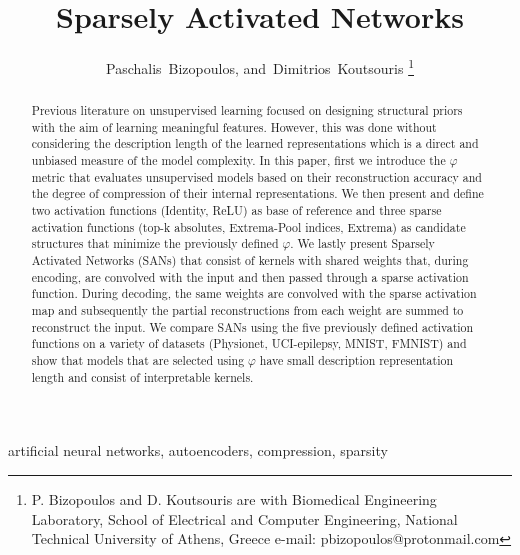 \documentclass[journal]{IEEEtran}
\begin{document}

\title{Sparsely Activated Networks}
\author{Paschalis~Bizopoulos, and~Dimitrios~Koutsouris
\thanks{P. Bizopoulos and D. Koutsouris are with Biomedical Engineering Laboratory, School of Electrical and Computer Engineering, National Technical University of Athens, Greece e-mail: pbizopoulos@protonmail.com}}

\maketitle

\begin{abstract}
	Previous literature on unsupervised learning focused on designing structural priors with the aim of learning meaningful features.
	However, this was done without considering the description length of the learned representations which is a direct and unbiased measure of the model complexity.
	In this paper, first we introduce the $\varphi$ metric that evaluates unsupervised models based on their reconstruction accuracy and the degree of compression of their internal representations.
	We then present and define two activation functions (Identity, ReLU) as base of reference and three sparse activation functions (top-k absolutes, Extrema-Pool indices, Extrema) as candidate structures that minimize the previously defined $\varphi$.
	We lastly present Sparsely Activated Networks (SANs) that consist of kernels with shared weights that, during encoding, are convolved with the input and then passed through a sparse activation function.
	During decoding, the same weights are convolved with the sparse activation map and subsequently the partial reconstructions from each weight are summed to reconstruct the input.
	We compare SANs using the five previously defined activation functions on a variety of datasets (Physionet, UCI-epilepsy, MNIST, FMNIST) and show that models that are selected using $\varphi$ have small description representation length and consist of interpretable kernels.
\end{abstract}

\begin{IEEEkeywords}
	artificial neural networks, autoencoders, compression, sparsity
\end{IEEEkeywords}
\end{document}
